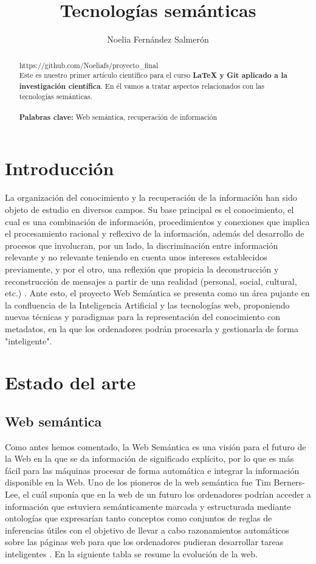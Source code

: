 \documentclass{article}
\title{Tecnologías semánticas}
\author{Noelia Fernández Salmerón }
\begin{document}
\maketitle
\begin{abstract}
https://github.com/Noeliafs/proyecto\_final\\
Este es nuestro primer artículo científico para el curso {\bf LaTeX y Git aplicado a la investigación científica}. En él vamos a tratar aspectos relacionados con las tecnologías semánticas.\\
\\
{\bf Palabras clave:} Web semántica, recuperación de información
\end{abstract}
\section{Introducción}
La organización del conocimiento y la recuperación de la información han sido objeto de estudio en diversos campos. Su base principal es el conocimiento, el cual es una combinación de información, procedimientos y conexiones que implica el procesamiento racional y reflexivo de la información, además del desarrollo de procesos que involucran, por un lado, la discriminación entre información relevante y no relevante teniendo en cuenta unos intereses establecidos previamente, y por el otro, una reflexión que propicia la deconstrucción y reconstrucción de mensajes a partir de una
realidad (personal, social, cultural, etc.) \cite{Pena2011}.
Ante esto, el proyecto Web Semántica se presenta como un área pujante en la confluencia de la Inteligencia Artificial y las tecnologías web, proponiendo nuevas técnicas y paradigmas para la representación del conocimiento con metadatos, en la que los ordenadores podrán procesarla y gestionarla de forma "inteligente"\cite{Garcia2005}. 
\section{Estado del arte}
\subsection{Web semántica}
Como antes hemos comentado, la Web Semántica es una visión para el futuro de la Web en la que se da información de significado explícito, por lo que es más fácil para las máquinas procesar de forma automática e integrar la información disponible en la Web. Uno de los pioneros de la web semántica fue Tim Berners-Lee, el cuál suponía que en la web de un futuro los ordenadores podrían acceder a información que estuviera semánticamente marcada y estructurada mediante ontologías que expresarían tanto conceptos como conjuntos de reglas de inferencias útiles con el objetivo de llevar a cabo razonamientos automáticos sobre las páginas web para que los ordenadores pudieran desarrollar tareas inteligentes \cite{Codina2009}. En la siguiente tabla se resume la evolución de la web.
\end{document}
